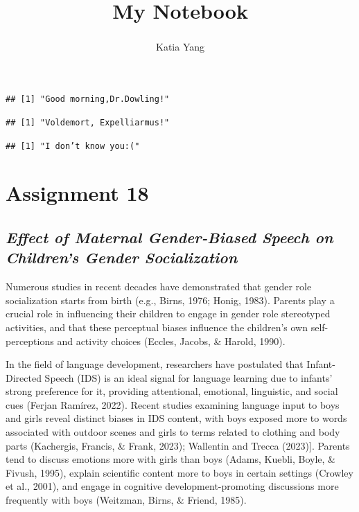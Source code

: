 \documentclass[
  man]{apa6}
\title{My Notebook}
\author{Katia Yang\textsuperscript{}}
\date{}
\affiliation{\phantom{0}}
\begin{document}
\maketitle

\begin{verbatim}
## [1] "Good morning,Dr.Dowling!"
\end{verbatim}

\begin{verbatim}
## [1] "Voldemort, Expelliarmus!"
\end{verbatim}

\begin{verbatim}
## [1] "I don’t know you:("
\end{verbatim}

\hypertarget{assignment-18}{%
\section{Assignment 18}\label{assignment-18}}

\hypertarget{effect-of-maternal-gender-biased-speech-on-childrens-gender-socialization}{%
\subsection{\texorpdfstring{\emph{Effect of Maternal Gender-Biased Speech on Children's Gender Socialization}}{Effect of Maternal Gender-Biased Speech on Children's Gender Socialization}}\label{effect-of-maternal-gender-biased-speech-on-childrens-gender-socialization}}

Numerous studies in recent decades have demonstrated that gender role socialization starts from birth (e.g., Birns, 1976; Honig, 1983). Parents play a crucial role in influencing their children to engage in gender role stereotyped activities, and that these perceptual biases influence the children's own self-perceptions and activity choices (Eccles, Jacobs, \& Harold, 1990).

In the field of language development, researchers have postulated that Infant-Directed Speech (IDS) is an ideal signal for language learning due to infants' strong preference for it, providing attentional, emotional, linguistic, and social cues (Ferjan Ramírez, 2022). Recent studies examining language input to boys and girls reveal distinct biases in IDS content, with boys exposed more to words associated with outdoor scenes and girls to terms related to clothing and body parts (Kachergis, Francis, \& Frank, 2023); Wallentin and Trecca (2023){]}. Parents tend to discuss emotions more with girls than boys (Adams, Kuebli, Boyle, \& Fivush, 1995), explain scientific content more to boys in certain settings (Crowley et al., 2001), and engage in cognitive development-promoting discussions more frequently with boys (Weitzman, Birns, \& Friend, 1985).
\end{document}

